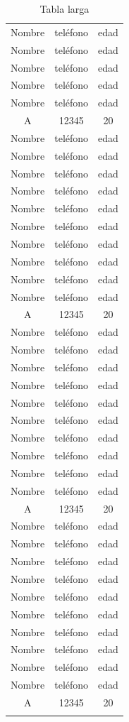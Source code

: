 \documentclass[12pt]{article}
\begin{document}
\begin{longtable}[c]{|ccc|}
Nombre & teléfono & edad \\
Nombre & teléfono & edad \\
Nombre & teléfono & edad \\
Nombre & teléfono & edad \\
Nombre & teléfono & edad \\
A & 12345 & 20 \\
Nombre & teléfono & edad \\
Nombre & teléfono & edad \\
Nombre & teléfono & edad \\
Nombre & teléfono & edad \\
Nombre & teléfono & edad \\
Nombre & teléfono & edad \\
Nombre & teléfono & edad \\
Nombre & teléfono & edad \\
Nombre & teléfono & edad \\
Nombre & teléfono & edad \\
A & 12345 & 20 \\
Nombre & teléfono & edad \\
Nombre & teléfono & edad \\
Nombre & teléfono & edad \\
Nombre & teléfono & edad \\
Nombre & teléfono & edad \\
Nombre & teléfono & edad \\
Nombre & teléfono & edad \\
Nombre & teléfono & edad \\
Nombre & teléfono & edad \\
Nombre & teléfono & edad \\
A & 12345 & 20 \\
Nombre & teléfono & edad \\
Nombre & teléfono & edad \\
Nombre & teléfono & edad \\
Nombre & teléfono & edad \\
Nombre & teléfono & edad \\
Nombre & teléfono & edad \\
Nombre & teléfono & edad \\
Nombre & teléfono & edad \\
Nombre & teléfono & edad \\
Nombre & teléfono & edad \\
A & 12345 & 20 \\
\caption{Tabla larga}
\label{TablaLargaEjempplo}
\end{longtable}
\end{document}
